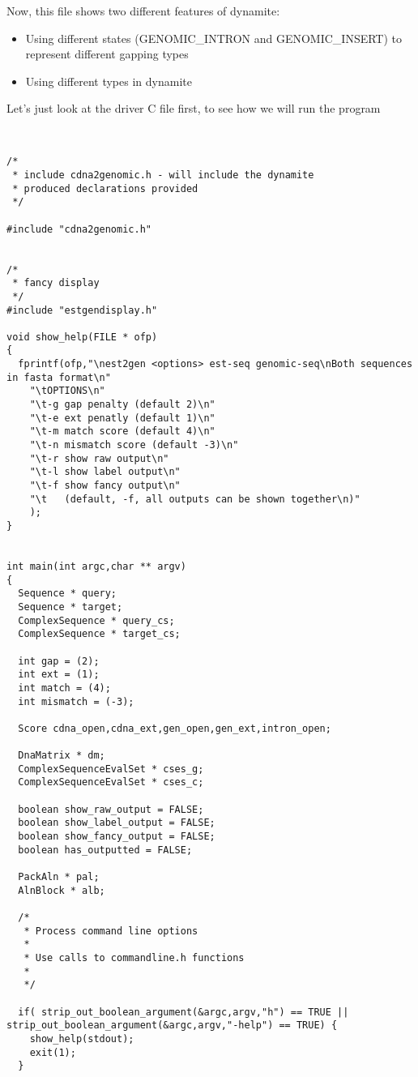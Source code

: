 Now, this file shows two different features of dynamite: 

\begin{itemize}
\item Using different states (GENOMIC\_INTRON and GENOMIC\_INSERT) to represent
different gapping types
\item Using different types in dynamite
\end{itemize}

Let's just look at the driver C file first, to see how we will run the
program

\begin{verbatim}


/*
 * include cdna2genomic.h - will include the dynamite
 * produced declarations provided
 */

#include "cdna2genomic.h" 


/*
 * fancy display 
 */
#include "estgendisplay.h"

void show_help(FILE * ofp)
{
  fprintf(ofp,"\nest2gen <options> est-seq genomic-seq\nBoth sequences in fasta format\n"
    "\tOPTIONS\n"
    "\t-g gap penalty (default 2)\n"
    "\t-e ext penatly (default 1)\n"
    "\t-m match score (default 4)\n"
    "\t-n mismatch score (default -3)\n"
    "\t-r show raw output\n"
    "\t-l show label output\n"
    "\t-f show fancy output\n"
    "\t   (default, -f, all outputs can be shown together\n)"
    );
}


int main(int argc,char ** argv)
{
  Sequence * query;
  Sequence * target;
  ComplexSequence * query_cs;
  ComplexSequence * target_cs;

  int gap = (2);
  int ext = (1);
  int match = (4);
  int mismatch = (-3);

  Score cdna_open,cdna_ext,gen_open,gen_ext,intron_open;

  DnaMatrix * dm;
  ComplexSequenceEvalSet * cses_g;
  ComplexSequenceEvalSet * cses_c;

  boolean show_raw_output = FALSE;
  boolean show_label_output = FALSE;
  boolean show_fancy_output = FALSE;
  boolean has_outputted = FALSE;

  PackAln * pal;
  AlnBlock * alb;
  
  /*
   * Process command line options
   *
   * Use calls to commandline.h functions
   *
   */
  
  if( strip_out_boolean_argument(&argc,argv,"h") == TRUE || strip_out_boolean_argument(&argc,argv,"-help") == TRUE) {
    show_help(stdout);
    exit(1);
  }


\end{verbatim}
